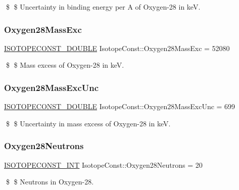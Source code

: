 \$ \$ Uncertainty in binding energy per A of Oxygen-\/28 in keV. \mbox{\label{group___isotope_const-_oxygen-_o28_gae33a3721428f6e98ef31afcb29285e3a}} 
\subsubsection{\texorpdfstring{Oxygen28\+Mass\+Exc}{Oxygen28MassExc}}
{\footnotesize\ttfamily \mbox{\hyperlink{group___isotope_const-_macros_ga8f45a7272ce02c0b4c65c44636ed719a}{I\+S\+O\+T\+O\+P\+E\+C\+O\+N\+S\+T\+\_\+\+D\+O\+U\+B\+LE}} Isotope\+Const\+::\+Oxygen28\+Mass\+Exc = 52080}

\$ \$ Mass excess of Oxygen-\/28 in keV. \mbox{\label{group___isotope_const-_oxygen-_o28_ga528373441ee736973b78b7750d2f9333}} 
\subsubsection{\texorpdfstring{Oxygen28\+Mass\+Exc\+Unc}{Oxygen28MassExcUnc}}
{\footnotesize\ttfamily \mbox{\hyperlink{group___isotope_const-_macros_ga8f45a7272ce02c0b4c65c44636ed719a}{I\+S\+O\+T\+O\+P\+E\+C\+O\+N\+S\+T\+\_\+\+D\+O\+U\+B\+LE}} Isotope\+Const\+::\+Oxygen28\+Mass\+Exc\+Unc = 699}

\$ \$ Uncertainty in mass excess of Oxygen-\/28 in keV. \mbox{\label{group___isotope_const-_oxygen-_o28_ga0e9e0a9d63e3ee5214d5bc21e894fd0d}} 
\subsubsection{\texorpdfstring{Oxygen28\+Neutrons}{Oxygen28Neutrons}}
{\footnotesize\ttfamily \mbox{\hyperlink{group___isotope_const-_macros_ga5f18360b3e99483a35c32d789e62621c}{I\+S\+O\+T\+O\+P\+E\+C\+O\+N\+S\+T\+\_\+\+I\+NT}} Isotope\+Const\+::\+Oxygen28\+Neutrons = 20}

\$ \$ Neutrons in Oxygen-\/28. \mbox{\label{group___isotope_const-_oxygen-_o28_ga0a03582cb97595a742db183ce473b5b0}} 
